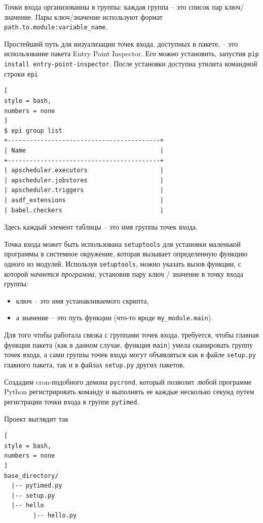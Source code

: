 \documentclass[%
	11pt,
	a4paper,
	utf8,
		]{article}
\begin{document}
Точки входа организованны в группы: каждая группа -- это список пар ключ/значение. Пары ключ/значение используют формат \texttt{path.to.module:variable\_name}. 

Простейший путь для визуализации точек входа, доступных в пакете, -- это использование пакета Entry Point Inspector. Его можно установить, запустив \texttt{pip install entry-point-inspector}. После установки доступна утилита командной строки \texttt{epi}
\begin{lstlisting}[
style = bash,
numbers = none	
]
$ epi group list
+------------------------------------------+
| Name                                     |
+------------------------------------------+
| apscheduler.executors                    |
| apscheduler.jobstores                    |
| apscheduler.triggers                     |
| asdf_extensions                          |
| babel.checkers                           |
\end{lstlisting}

Здесь каждый элемент таблицы -- это имя группы точек входа.

Точка входа может быть использована \texttt{setuptools} для установки маленькой программы в системное окружение, которая вызывает определенную функцию одного из модулей. Используя \texttt{setuptools}, можно указать вызов функции, с которой \emph{начнется программа}, установив пару ключ / значение в точку входа группы:
\begin{itemize}
	\item ключ -- это имя устанавливаемого скрипта,
	
	\item а значение -- это путь функции (что-то вроде \texttt{my\_module.main}).
\end{itemize}

Для того чтобы работала связка с группами точек входа, требуется, чтобы главная функция пакета (как в данном случае, функция \texttt{main}) умела сканировать группу точек входа, а сами группы точек входа могут объявляться как в файле \texttt{setup.py} главного пакета, так и в файлах \texttt{setup.py} других пакетов.

Создадим cron-подобного демона \texttt{pycrond}, который позволит любой программе Python регистрировать команду и выполнять ее каждые несколько секунд путем регистрации точки входа в группе \texttt{pytimed}.

Проект выглядит так
\begin{lstlisting}[
style = bash,
numbers = none	
]
base_directory/
  |-- pytimed.py
  |-- setup.py
  |-- hello
        |-- hello.py
\end{lstlisting}
\end{document}
